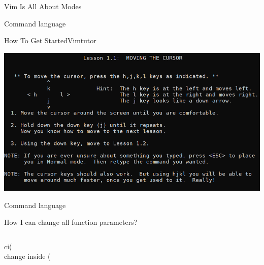 \documentclass{beamer}
\begin{document}
\begin{frame}{Vim Is All About Modes}
\end{frame}
\usebackgroundtemplate{}

\begin{frame}{Command language}
\end{frame}

\begin{frame}{How To Get Started}{Vimtutor}
    \begin{center}
		\includegraphics[width=1\textwidth]{images/vimtutor.png}
    \end{center}
\end{frame}

\begin{frame}{Command language}
	\begin{block}{How I can change all function parameters?}
	\end{block}
    \inputminted{js}{codes/changeInParentheses.js}
	\begin{center}
		\huge
		ci(
		\\
		\alert change \alert inside \alert (
	\end{center}
\end{frame}
\end{document}
